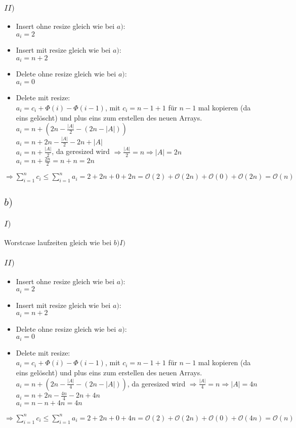\documentclass[a4paper]{scrartcl}
\begin{document}
\subsubsection*{$II)$}
\begin{itemize}
	\item Insert ohne resize gleich wie bei $a)$:\\
		$a_i = 2$
	\item  Insert mit resize gleich wie bei $a)$:\\
		$a_i =n+2$	
	\item Delete ohne resize gleich wie bei $a)$:\\
		$a_i = 0$
	\item Delete mit resize:\\
		$a_i = c_i + \Phi(i) - \Phi(i-1)$, mit $c_i = n-1+1$ für $n-1$ mal kopieren (da eins gelöscht) und plus eins zum erstellen des neuen Arrays.\\		
		$a_i = n + (2n - \frac{|A|}{2} - (2n- |A|))$\\
		$a_i = n + 2n - \frac{|A|}{2} - 2n + |A|$\\
		$a_i = n + \frac{|A|}{2}$, da geresized wird $\Rightarrow \frac{|A|}{2} = n \Rightarrow |A| = 2n$\\
		$a_i = n + \frac{2n}{2} = n+n = 2n$
\end{itemize}
$\Rightarrow \sum_{i=1}^{n} c_i \le \sum_{i=1}^{n} a_i = 2+2n+0+2n = \mathcal{O}(2) + \mathcal{O}(2n) + \mathcal{O}(0) + \mathcal{O}(2n) = \mathcal{O}(n)$
\subsection*{$b)$}
\subsubsection*{$I)$}
Worstcase laufzeiten gleich wie bei $b)I)$
\subsubsection*{$II)$}
\begin{itemize}
	\item Insert ohne resize gleich wie bei $a)$:\\
		$a_i = 2$
	\item  Insert mit resize gleich wie bei $a)$:\\
		$a_i =n+2$	
	\item Delete ohne resize gleich wie bei $a)$:\\
		$a_i = 0$
	\item Delete mit resize:\\
		$a_i = c_i + \Phi(i) - \Phi(i-1)$, mit $c_i = n-1+1$ für $n-1$ mal kopieren (da eins gelöscht) und plus eins zum erstellen des neuen Arrays.\\		
		$a_i = n + (2n - \frac{|A|}{4} - (2n- |A|))$, da geresized wird $\Rightarrow \frac{|A|}{4} = n \Rightarrow |A| = 4n$\\
		$a_i = n + 2n -\frac{4n}{4} -2n + 4n$\\
		$a_i = n -n +4n = 4n$
\end{itemize}
$\Rightarrow \sum_{i=1}^{n} c_i \le \sum_{i=1}^{n} a_i = 2+2n+0+4n = \mathcal{O}(2) + \mathcal{O}(2n) + \mathcal{O}(0) + \mathcal{O}(4n) = \mathcal{O}(n)$
\end{document}
